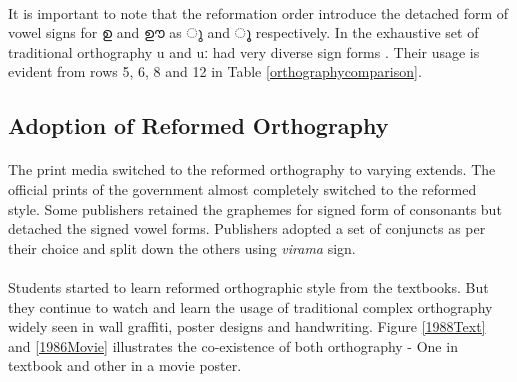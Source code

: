 \documentclass[10pt]{article}
\begin{document}
\paragraph{}
It is important to note that the reformation order introduce the detached form of vowel signs for {\manjari ഉ } and {\manjari ഊ } as {\manjari ു } and {\manjari ൂ } respectively. In the exhaustive set of traditional orthography u and uː had very diverse sign forms \cite{kavya}. Their usage is evident from rows 5, 6, 8 and 12 in Table \ref{orthographycomparison}.

\subsection{Adoption of Reformed Orthography}
\paragraph{}
The print media switched to the reformed orthography to varying extends. The official prints of the government almost completely switched to the reformed style. Some publishers retained the graphemes for signed form of consonants but detached the signed vowel forms. Publishers adopted a set of conjuncts as per their choice and split down the others using \textit{virama} sign.
\paragraph{}
Students started to learn reformed orthographic style from the textbooks. But they continue to watch and learn the usage of traditional complex orthography widely seen in wall graffiti, poster designs and handwriting. Figure \ref{1988Text} and \ref{1986Movie} illustrates the co-existence of both orthography - One in textbook and other in a movie poster.
\end{document}
